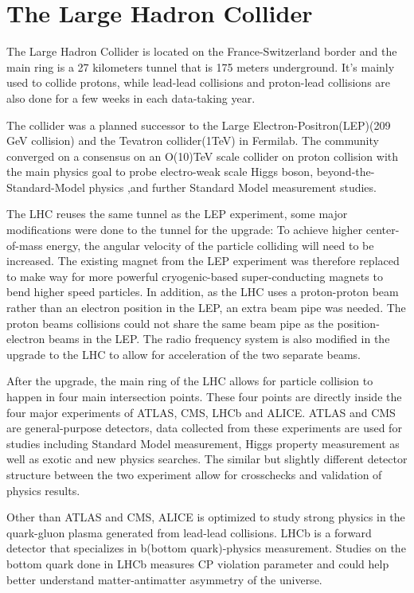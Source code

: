 
\section{The Large Hadron Collider}
\label{LHC}

The Large Hadron Collider is located on the France-Switzerland border and the main ring is a 27 kilometers tunnel that is 175 meters underground. It's mainly used to collide protons, while lead-lead collisions and proton-lead collisions are also done for a few weeks in each data-taking year. 

The collider was a planned successor to the Large Electron-Positron(LEP)(209 GeV collision) and the Tevatron collider(1TeV) in Fermilab. The community converged on a consensus on an O(10)TeV scale collider on proton collision with the main physics goal to probe electro-weak scale Higgs boson, beyond-the-Standard-Model physics ,and further Standard Model measurement studies.

The LHC reuses the same tunnel as the LEP experiment, some major modifications were done to the tunnel for the upgrade: To achieve higher center-of-mass energy, the angular velocity of the particle colliding will need to be increased. The existing magnet from the LEP experiment was therefore replaced to make way for more powerful cryogenic-based super-conducting magnets to bend higher speed particles. In addition, as the LHC uses a proton-proton beam rather than an electron position in the LEP, an
extra beam pipe was needed. The proton beams collisions could not share the same beam pipe as the position-electron beams in the LEP. The radio frequency system is also modified in the upgrade to the LHC to allow for acceleration of the two separate beams. 


After the upgrade, the main ring of the LHC allows for particle collision to happen in four main intersection points. These four points are directly inside the four major experiments of ATLAS, CMS, LHCb and ALICE. 
ATLAS and CMS are general-purpose detectors, data collected from these experiments are used for studies including Standard Model measurement, Higgs property measurement as well as exotic and new physics searches. The similar but slightly different detector structure between the two experiment allow for crosschecks
and validation of physics results.

Other than ATLAS and CMS, ALICE is optimized to study strong physics in the quark-gluon plasma generated from lead-lead collisions. LHCb is a forward detector that specializes in b(bottom quark)-physics measurement. Studies on the bottom quark done in LHCb measures CP violation parameter and could help better understand matter-antimatter asymmetry of the universe. 

